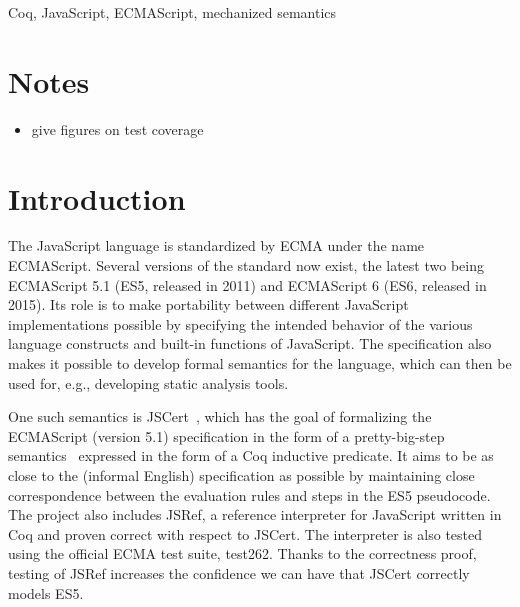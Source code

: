 \documentclass{sigplanconf}
\begin{document}

\keywords
Coq, JavaScript, ECMAScript, mechanized semantics

\section{Notes}

\begin{itemize}
\item give figures on test coverage
\end{itemize}

\section{Introduction}

The JavaScript language is standardized by ECMA under the name
ECMAScript. Several versions of the standard now exist, the latest
two being ECMAScript 5.1 (ES5, released in 2011) and ECMAScript 6
(ES6, released in 2015). Its role is to make portability between different
JavaScript implementations possible by specifying the intended behavior
of the various language constructs and built-in functions of JavaScript.
The specification also makes it possible to develop formal semantics
for the language, which can then be used for, e.g., developing
static analysis tools.

One such semantics is JSCert~\cite{Bodin-al:POPL14}, which has the
goal of formalizing the ECMAScript (version 5.1) specification in the form of
a pretty-big-step semantics~\cite{Chargueraud:ESOP13} expressed in 
the form of a Coq inductive predicate. It aims to be as close to the
(informal English) specification as possible by maintaining close correspondence
between the evaluation rules and steps in the ES5 pseudocode. The project
also includes JSRef, a reference interpreter for JavaScript written in Coq
and proven correct with respect to JSCert. The interpreter is also tested
using the official ECMA test suite, test262. Thanks to the correctness proof,
testing of JSRef increases the confidence we can have that JSCert
correctly models ES5.
\end{document}
